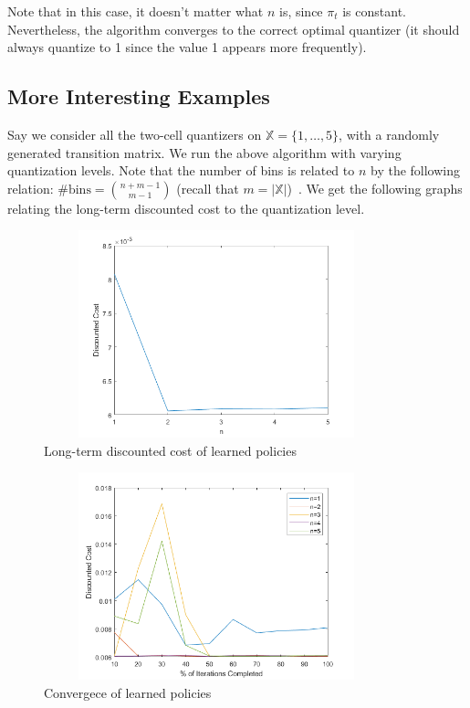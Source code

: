 \documentclass{article}
\begin{document}
Note that in this case, it doesn't matter what \( n \) is, since \( \pi_t \) is constant. Nevertheless, the algorithm converges to the correct optimal quantizer (it should always quantize to 1 since the value 1 appears more frequently).

\subsection{More Interesting Examples}

Say we consider all the two-cell quantizers on \( \mathbb{X} = \{1,\ldots,5\} \), with a randomly generated transition matrix. We run the above algorithm with varying quantization levels. Note that the number of bins is related to \( n \) by the following relation: \( \text{\# bins} = {{n+m-1} \choose {m-1}} \) (recall that \( m = |\mathbb{X}| \))~\cite{Reznik}. We get the following graphs relating the long-term discounted cost to the quantization level.

\begin{figure}[H]
    \centering
    \includegraphics[height=6cm, width=10cm]{Cost_5.png}
    \caption{Long-term discounted cost of learned policies}
\end{figure}

\begin{figure}[H]
    \centering
    \includegraphics[height=6cm, width=10cm]{Quantization_5.png}
    \caption{Convergece of learned policies}
\end{figure}
\end{document}
